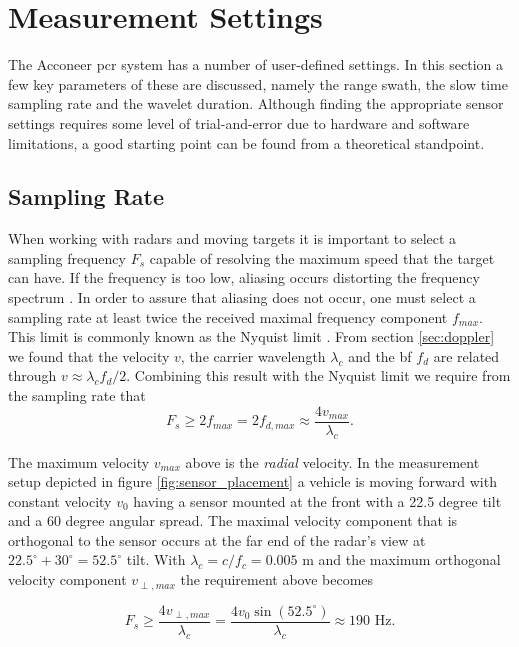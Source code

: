 \section{Measurement Settings}

The Acconeer \gls{pcr} system has a number of user-defined settings. In this section a few key parameters of these are discussed, namely the range swath, the slow time sampling rate and the wavelet duration. Although finding the appropriate sensor settings requires some level of trial-and-error due to hardware and software limitations, a good starting point can be found from a theoretical standpoint. 

\subsection{Sampling Rate}\label{sec:srate}
When working with radars and moving targets it is important to select a sampling frequency $F_s$ capable of resolving the maximum speed that the target can have. If the frequency is too low, aliasing occurs distorting the frequency spectrum \citep{lindgren_rootzeŽn_sandsten_2013}. In order to assure that aliasing does not occur, one must select a sampling rate at least twice the received maximal frequency component $f_{max}$. This limit is commonly known as the Nyquist limit \citep{proakis_manolakis_1995}. From section \ref{sec:doppler} we found that the velocity $v$, the carrier wavelength $\lambda_c$ and the \gls{bf} $f_d$ are related through $v \approx \lambda_cf_d/2$. Combining this result with the Nyquist limit we require from the sampling rate that
\begin{equation}
\label{eq:nyquist}
		F_{s} \geq 2f_{max} 
		= 2f_{d,max} 
		\approx \frac{4v_{max}}{\lambda_c}.
\end{equation}

The maximum velocity $v_{max}$ above is the \emph{radial} velocity. In the measurement setup depicted in figure \ref{fig:sensor_placement} a vehicle is moving forward with constant velocity $v_0$ having a sensor mounted at the front with a 22.5 degree tilt and a 60 degree angular spread. The maximal velocity component that is orthogonal to the sensor occurs at the far end of the radar's view at $22.5^\circ + 30^\circ = 52.5^\circ$ tilt. With $\lambda_c=c/f_c=0.005$ m and the maximum orthogonal velocity component $v_{\perp, max}$ the requirement above becomes

\begin{equation}
	F_s \geq 
	\frac{4v_{\perp, max}}{\lambda_c}
	= \frac{4v_0\sin(52.5^\circ)}{\lambda_c} 
	\approx 190 \text{ Hz}.
\end{equation}

